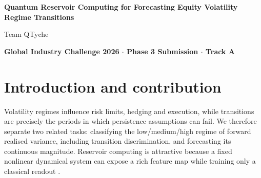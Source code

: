 \documentclass[11pt,a4paper]{article}
\begin{document}
\begin{center}
{\large \textbf{Quantum Reservoir Computing for Forecasting Equity
Volatility Regime Transitions}}

{\small Team QTyche}

\textbf{\small Global Industry Challenge 2026 $\cdot$ Phase 3
Submission $\cdot$ Track A}
\end{center}

\begin{abstract}
We evaluate a compact exact-simulation quantum reservoir computer for
five-day equity-volatility regime classification and realised-variance
forecasting against persistence, logistic-regression, Echo State Network and
GARCH baselines. The QRC achieves test macro-F1 of 0.454, transition PR-AUC of
0.640 and QLIKE of \(-2.814\), but does not consistently outperform the
strongest classical methods. On genuine MNIST it achieves mean accuracy of
0.874, compared with 0.934 for the ESN. Independent qBraid reproduction
confirms the findings, with narrowly characterised platform-sensitive solver
variation. The study establishes reproducibility and competitive behaviour,
not quantum advantage.
\end{abstract}

\section{Introduction and contribution}

Volatility regimes influence risk limits, hedging and execution, while
transitions are precisely the periods in which persistence assumptions can
fail. We therefore separate two related tasks: classifying the low/medium/high
regime of forward realised variance, including transition discrimination, and
forecasting its continuous magnitude. Reservoir computing is attractive
because a fixed nonlinear dynamical system can expose a rich feature map while
training only a classical readout \cite{jaeger2001echo,fujii2017harnessing}.
\end{document}
